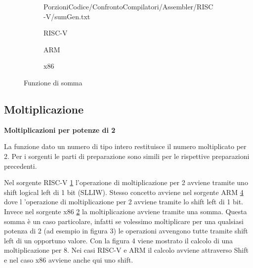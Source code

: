 \documentclass[12pt,a4paper]{report}
\begin{document}
\begin{figure}[h]
     
     \begin{subfigure}[b]{0.3\textwidth}
  
         {PorzioniCodice/ConfrontoCompilatori/Assembler/RISC-V/sumGen.txt}
	\label{Code:Add2RISC}
\caption{RISC-V}
     \end{subfigure}
     \hfill
     \begin{subfigure}[b]{0.3\textwidth}
         
          
          \label{Code:Add2ARM}
\caption{ARM}
     \end{subfigure}
     \hfill
     \begin{subfigure}[b]{0.3\textwidth}
         
          
	 \caption{x86}
	\label{Code:Add2X86}
     \end{subfigure}
    
        \caption{Funzione di somma}
        
\end{figure}



\subsection{Moltiplicazione}

\vspace{0.3 cm}
\textbf{Moltiplicazioni per potenze di 2}



La funzione dato un numero di tipo intero restituisce il numero moltiplicato per 2.  Per i sorgenti le parti di preparazione sono simili per le rispettive preparazioni precedenti.



\vspace{0.3 cm}
Nel sorgente RISC-V \ref{Code:Add2RISC} l'operazione di moltiplicazione per 2 avviene tramite uno shift logical left di 1 bit (SLLIW). Stesso concetto avviene nel sorgente ARM \ref{Code:Add2X86} dove l 'operazione di moltiplicazione per 2 avviene tramite lo shift left di 1 bit. Invece nel sorgente x86 \ref{Code:Add2ARM} la moltiplicazione avviene tramite una somma. Questa somma è un caso particolare, infatti se volessimo moltiplicare per una qualsiasi potenza di 2 (ad esempio in figura 3) le operazioni avvengono tutte tramite shift left di un opportuno valore. Con la figura 4 viene mostrato il calcolo di una moltiplicazione per 8. Nei casi RISC-V e ARM il calcolo avviene attraverso Shift e nel caso x86 avviene anche qui uno shift.
\end{document}
